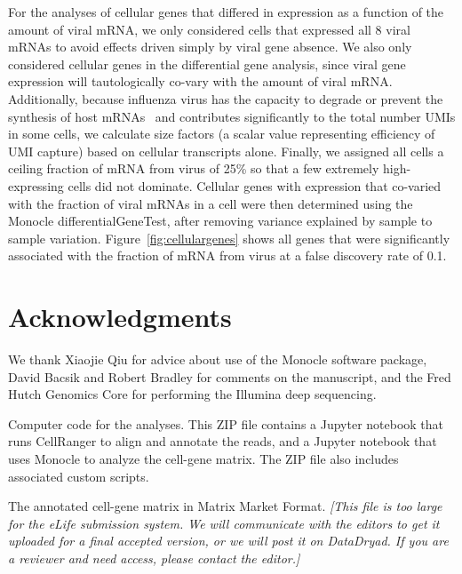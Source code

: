 \documentclass[9pt,lineno]{elife}
\newcommand{\jdbcomment}[1]{\emph{\color{red} [#1]}}
\begin{document}
For the analyses of cellular genes that differed in expression as a function of the amount of viral mRNA, we only considered cells that expressed all 8 viral mRNAs to avoid effects driven simply by viral gene absence.
We also only considered cellular genes in the differential gene analysis, since viral gene expression will tautologically co-vary with the amount of viral mRNA.
Additionally, because influenza virus has the capacity to degrade or prevent the synthesis of host mRNAs~\citep{BercovichKinori:2016iw} and contributes significantly to the total number UMIs in some cells, we calculate size factors (a scalar value representing efficiency of UMI capture) based on cellular transcripts alone. 
Finally, we assigned all cells a ceiling fraction of mRNA from virus of 25\% so that a few extremely high-expressing cells did not dominate. 
Cellular genes with expression that co-varied with the fraction of viral mRNAs in a cell were then determined using the Monocle differentialGeneTest, after removing variance explained by sample to sample variation. 
Figure~\ref{fig:cellulargenes} shows all genes that were significantly associated with the fraction of mRNA from virus at a false discovery rate of 0.1.

\section{Acknowledgments}
We thank Xiaojie Qiu for advice about use of the Monocle software package, David Bacsik and Robert Bradley for comments on the manuscript, and the Fred Hutch Genomics Core for performing the Illumina deep sequencing.



\clearpage

\begin{suppfile}
\caption{\label{suppfile:code}
Computer code for the analyses.
This ZIP file contains a Jupyter notebook that runs CellRanger to align and annotate the reads, and a Jupyter notebook that uses Monocle to analyze the cell-gene matrix.
The ZIP file also includes associated custom scripts.}
\end{suppfile}

\begin{suppfile}
\caption{\label{suppfile:cellgenematrix}
The annotated cell-gene matrix in Matrix Market Format.
\jdbcomment{This file is too large for the \textit{eLife} submission system. We will communicate with the editors to get it uploaded for a final accepted version, or we will post it on DataDryad. If you are a reviewer and need access, please contact the editor.}
}
\end{suppfile}
\end{document}
